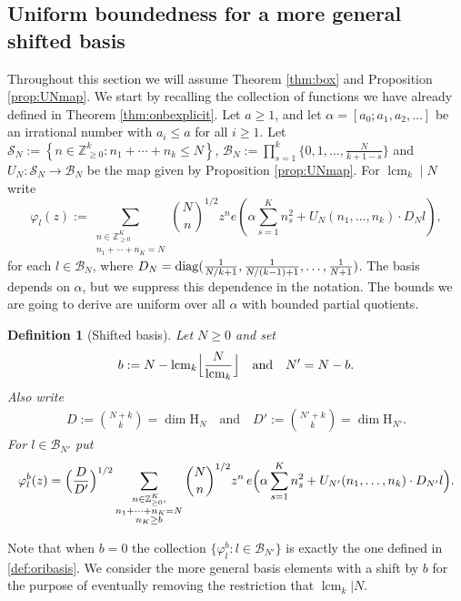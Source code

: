 \documentclass[a4paper,reqno,12pt]{amsart}
\theoremstyle{plain}
\theoremstyle{plain}
\newtheorem{definition}[theorem]{Definition}
\theoremstyle{remark}
\theoremstyle{plain}
\newcommand{\B}{\mathscr{B}}
\newcommand{\PolySpace}{\mathrm{H}}
\newcommand{\cS}{\mathscr{S}}
\newcommand{\n}{\mathbb{N}}
\newcommand{\z}{\mathbb{Z}}
\newcommand{\al}{\alpha}
\newcommand{\p}{\varphi}
\newcommand{\Z}{\mathbb{Z}}
\newcommand{\lcmk}{\operatorname{lcm}_k}
\theoremstyle{plain}
\theoremstyle{plain}
\begin{document}
{\subsection{Uniform boundedness for a more general shifted basis}
Throughout this section we will assume Theorem \ref{thm:box} and Proposition \ref{prop:UNmap}. 
We start by recalling the collection of functions we have already defined in Theorem \ref{thm:onbexplicit}.  
Let {$a\geq1$, and let $\alpha = [a_0; a_1, a_2, \ldots]$ be an}
irrational number with $a_i \leq a$ for all $i \geq 1$. Let $\cS_{N}:=\left\{{n}\in \Z_{\ge0}^k:
  n_1+\cdots+n_k\le N\right\}$, $\B_{N}:=\prod_{s=1}^k \{0,1,\ldots, \frac{N}{k+1-s}\}$ and $U_N:\cS_N \to \B_N$ be the map given by Proposition \ref{prop:UNmap}. For  $\lcmk\mid N$  write
   \begin{equation}
  \p_{l}(z):=
  \sum_{\substack{n\in\mathbb Z_{\ge0}^K\\n_1+\cdots+n_K=N}}
  {\binom Nn^{1/2}z^n}
  e\left(\alpha\sum_{s=1}^Kn_s^2
  +U_N(n_1,\ldots,n_k)\cdot D_Nl\right),
  \label{def:oribasis}
  \end{equation}
 for each $l\in \B_N$, where $D_N = {\rm diag}(\frac{1}{N/k+1}, \frac{1}{N/(k - 1)+ 1},\ldots, \frac{1}{N+1})$. The basis depends on \(\alpha\), but we suppress this dependence in the notation. The bounds we are going to derive are uniform over all \(\alpha\) with bounded partial quotients.

\begin{definition}[Shifted basis]\label{def:shiftedbasis}
Let $N\geq 0$ and set
\begin{align}
b:=N-\lcmk\Bigl\lfloor\frac N{\lcmk}\Bigr\rfloor \quad \text{and} \quad N'=N-b.
\end{align}
Also write
\begin{align}
D:=\binom{N+k}{k}=\dim\PolySpace_N\quad \text{and}\quad
D':=\binom{N'+k}{k}=\dim\PolySpace_{N'}.
\label{eq:dimensions}
\end{align}
For $l\in\B_{N'}$ put
\begin{align}
\p^b_{l}(z)
=\Bigl(\frac{D}{D'}\Bigr)^{1/2}
\sum_{\substack{n\in\z_{\ge0}^K,\\ n_1+\cdots+n_K=N\\ n_K\ge b}}
\binom Nn^{1/2}z^n\,
e\Bigl(\al\sum_{s=1}^Kn_s^2
+U_{N'}(n_1,\ldots,n_k)\cdot D_{N'}l\Bigr).
\label{eq:shiftedBasis}
\end{align}
\end{definition}
Note that when $b=0$ the collection $\{\p^b_{l}: l\in \B_{N'}\}$ is exactly the one defined in \eqref{def:oribasis}. We consider the more general basis elements with a shift by $b$ for the purpose of eventually removing the restriction that $\lcmk | N$.  

}
\end{document}
